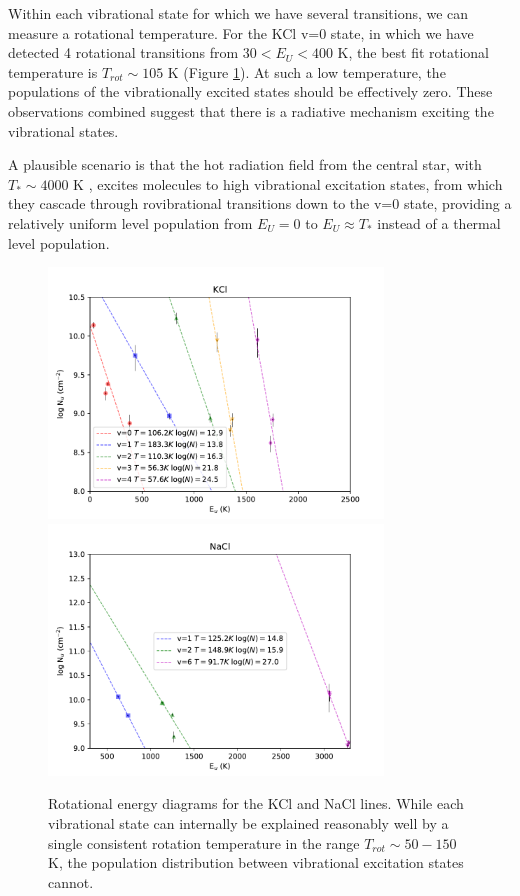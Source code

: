 \documentclass[twocolumn]{aastex62}
\begin{document}
Within each vibrational state for which we have several transitions, we can
measure a rotational temperature.  For the KCl v=0 state, in which we have
detected 4 rotational transitions from $30 < E_U < 400$ K, the best fit
rotational temperature is $T_{rot}\sim105$ K (Figure
\ref{fig:rotationdiagrams}).  At such a low temperature, the populations of the
vibrationally excited states should be effectively zero.  These observations
combined suggest that there is a radiative mechanism exciting the vibrational
states.

A plausible scenario is that the hot radiation field from the central star,
with $T_*\sim4000$ K \citep{Testi2010a}, excites molecules to high vibrational
excitation states, from which they cascade through rovibrational transitions
down to the v=0 state, providing a relatively uniform level population
from $E_U=0$ to $E_U\approx T_*$ instead of a thermal level population.

\begin{figure}[!htp]
\includegraphics[scale=1,width=3.5in]{figures/KCl_rotational_diagrams.pdf}
\includegraphics[scale=1,width=3.5in]{figures/NaCl_rotational_diagrams.pdf}
\caption{Rotational energy diagrams for the KCl and NaCl lines.  While each
vibrational state can internally be explained reasonably well by a single
consistent rotation temperature in the range $T_{rot}\sim50-150$ K, the population
distribution between vibrational excitation states cannot.}
\label{fig:rotationdiagrams}
\end{figure}









\end{document}
